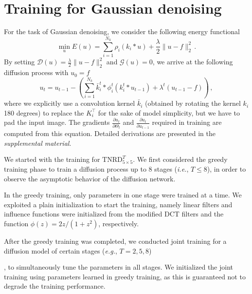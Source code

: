 \documentclass[10pt,journal,compsoc]{IEEEtran}
\newcommand{\cD}{\mathcal{D}}
\newcommand{\cG}{\mathcal{G}}
\newcommand{\suml}[2]{\sum\limits_{#1}^{#2}}
\newcommand{\eg}{\emph{e.g.}}
\newcommand{\ie}{\emph{i.e.}}
\begin{document}
\section{Training for Gaussian denoising}\label{sec:denoising}
For the task of Gaussian denoising, we consider the following energy functional
\[
\min\limits_{u} E(u) = \suml{i=1}{N_k}\rho_i(k_i * u) + \frac{\lambda}{2}\|u - f\|^2_2\,.
\]
By setting $\cD(u) = \frac{\lambda}{2}\|u - f\|^2_2$ and $\cG(u)  = 0$, 
we arrive at the following 
diffusion process with $u_0 = f$
\begin{equation}\label{denoising}
u_t = u_{t-1} - \left(\sum\limits_{i = 1}^{N_k}\bar k_i^t * \phi_i^t(k_i^t * u_{t-1}) + \lambda^t (u_{t-1} - f)
\right)\,,
\end{equation}
where we explicitly use a convolution kernel $\bar k_i$ (obtained by rotating the kernel $k_i$ 180 degrees) 
to replace the $K_i^\top$ for the sake of model simplicity, but we have to pad the input image. The gradients 
$\frac{\partial u_t}{\partial \Theta_t}$ and $\frac{\partial u_t}{\partial u_{t-1}}$ 
required in training are computed from this equation. Detailed derivations are presented in the \textit{supplemental material}. 

We started with the training for $\text{TNRD}_{5 \times 5}^T$. We first 
considered the greedy training phase to train a 
diffusion process up to 8 stages (\ie, $T \leq 8$), 
in order to observe the asymptotic behavior of the diffusion network. 
{
In the greedy training, only parameters in one stage were trained at a time. 
We exploited a plain initialization to start the training, namely 
linear filters and influence functions were initialized from the 
modified DCT filters and the function $\phi(z) = 2z/(1+z^2)$, respectively. 

After the greedy training was completed, we conducted joint training for a diffusion 
model of certain stages (\eg, $T = 2, 5, 8$)}, 
to simultaneously tune the parameters in all stages.
We initialized the joint training using parameters learned 
in greedy training, as this is guaranteed not to degrade the training performance. 

\begin{comment} 
{In practice, we 
also find that a plain initialization can actually lead to closely similar results. More experiments to investigate the influence of 
initialization appear in Sec. \ref{important}.}

In previous work \cite{CSF2014}, it is shown that joint training 
a model with filters of size $5 \times 5$ or larger hardly makes a difference relative to the result obtained by the greedy training. 
However, in our work we observed that joint training always improves the result of greedy training. 
\end{comment}
\end{document}
